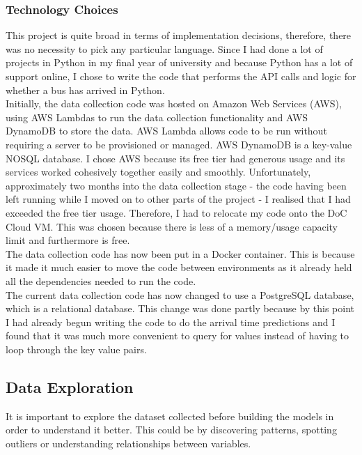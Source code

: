 \subsubsection{Technology Choices}

This project is quite broad in terms of implementation decisions, therefore, there was no necessity to pick any particular language. Since I had done a lot of projects in Python in my final year of university and because Python has a lot of support online, I chose to write the code that performs the API calls and logic for whether a bus has arrived in Python. \\

Initially, the data collection code was hosted on Amazon Web Services (AWS), using AWS Lambdas to run the data collection functionality and AWS DynamoDB to store the data. AWS Lambda allows code to be run without requiring a server to be provisioned or managed. AWS DynamoDB is a key-value NOSQL database. I chose AWS because its free tier had generous usage and its services worked cohesively together easily and smoothly. Unfortunately, approximately two months into the data collection stage - the code having been left running while I moved on to other parts of the project - I realised that I had exceeded the free tier usage. Therefore, I had to relocate my code onto the DoC Cloud VM. This was chosen because there is less of a memory/usage capacity limit and furthermore is free. \\

The data collection code has now been put in a Docker container. This is because it made it much easier to move the code between environments as it already held all the dependencies needed to run the code. \\

The current data collection code has now changed to use a PostgreSQL database, which is a relational database. This change was done partly because by this point I had already begun writing the code to do the arrival time predictions and I found that it was much more convenient to query for values instead of having to loop through the key value pairs. 

\subsection{Data Exploration}
\label{section:data-exploration}

It is important to explore the dataset collected before building the models in order to understand it better. This could be by discovering patterns, spotting outliers or understanding relationships between variables. \\

